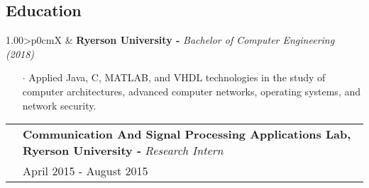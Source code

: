 \documentclass[a4paper, oneside, final]{scrartcl} %
\newcommand{\gray}{\rowcolor[gray]{.90}} %
\begin{document}
\begin{center}
  \section{Education}
  \begin{flushleft}
  \begin{tabularx}{1.00\linewidth}{>{\raggedleft\scshape}p{0cm}X}
    \gray& \textbf{Ryerson University -} \textit{Bachelor of Computer Engineering (2018)}\\
  \end{tabularx}
  \begin{itemize}\itemsep-0.2cm
      \vspace{-0.1cm}
        \item[$\cdot$] Applied Java, C, MATLAB, and VHDL technologies in the study of computer architectures, advanced computer networks, operating systems, and network security. \\
  \end{itemize}
  \end{flushleft}
  \begin{tabularx}{1.00\linewidth}{>{\raggedleft\scshape}p{0cm}X}
    \gray& \textbf{Communication And Signal Processing Applications Lab, Ryerson University -} \textit{Research Intern}\\
    \gray& {April 2015 - August 2015}\\
  \end{tabularx}
  \vspace{-0.2cm}
  \begin{itemize}\itemsep-0.2cm
      \vspace{-0.1cm}


\end{itemize}
\end{center}
\end{document}

